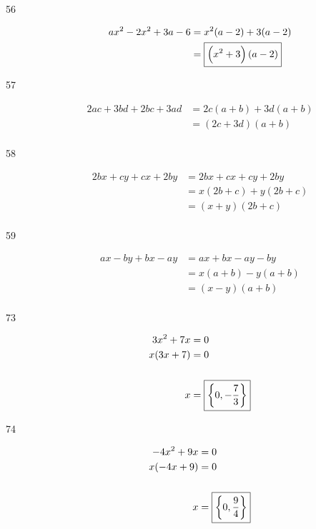 \documentclass[letterpaper, landscape]{exam}
\begin{document}
\begin{description}
      \item[56]
        \begin{align*}
          ax^2 - 2x^2 + 3a - 6 & = x^2 (a - 2) + 3(a - 2) \\
                               & = \boxed{ \del{x^2 + 3}(a - 2) } \\
        \end{align*}

      \item[57]
      \begin{align*}
         2ac + 3bd + 2bc + 3ad & = 2c(a + b) + 3d(a + b) \\
                               & = \boxed{ (2c + 3d)(a + b) } \\
      \end{align*}

      \item[58]
      \begin{align*}
        2bx + cy + cx + 2by & = 2bx + cx + cy + 2by \\
                            & = x(2b + c) + y(2b + c) \\
                            & = \boxed{ (x + y)(2b + c) } \\
      \end{align*}

      \item[59]
        \begin{align*}
          ax - by + bx - ay & = ax + bx -ay - by \\
                            & = x(a + b) - y(a + b) \\
                            & = \boxed{ (x - y)(a + b) } \\
        \end{align*}

      \item[73]
        \begin{align*}
          3x^2 + 7x & = 0 \\
          x(3x + 7) & = 0 \\
          \\
          x         & = \boxed{ \cbr{ 0, - \frac{7}{3} } } \\
        \end{align*}

      \item[74]
        \begin{align*}
          -4x^2 + 9x & = 0 \\
          x(-4x + 9) & = 0 \\
          \\
          x          & = \boxed{ \cbr{ 0, \frac{9}{4} } } \\
        \end{align*}


\end{description}
\end{document}
